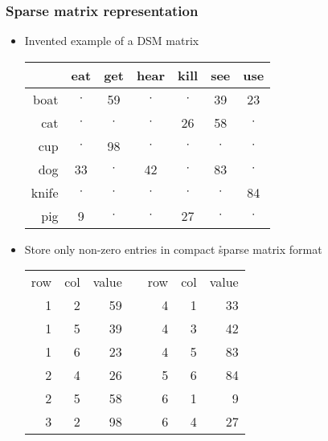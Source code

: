 \begin{frame}
  \frametitle{Sparse matrix representation}

  \ungap
  \begin{itemize}
  \item Invented example of a  DSM matrix
    \begin{center}\footnotesize
      \begin{tabular}{r | cccccc}
        & eat & get & hear & kill & see & use \\
        \midrule
        boat  &   $\cdot$  & 59  &   $\cdot$  &   $\cdot$  & 39 &  23 \\
        cat   &   $\cdot$  &  $\cdot$  &   $\cdot$  &  26  & 58 &   $\cdot$ \\
        cup   &   $\cdot$  & 98  &   $\cdot$  &   $\cdot$  &  $\cdot$ &   $\cdot$ \\
        dog   &  33  &  $\cdot$  &  42  &   $\cdot$  & 83 &   $\cdot$ \\
        knife &   $\cdot$  &  $\cdot$  &   $\cdot$  &   $\cdot$  &  $\cdot$ &  84 \\
        pig   &   9  &  $\cdot$  &   $\cdot$  &  27  &  $\cdot$ &   $\cdot$ 
      \end{tabular}
    \end{center}
    \gap\pause
  \item Store only non-zero entries in compact \h{sparse matrix format}
    \begin{center}\footnotesize
      \begin{tabular}{r|r|r c r|r|r}
        row & col & value && row & col & value \\
        \cline{1-3} \cline{5-7}
        1  &  2  &  59 &&  4  &  1  &  33 \\
        1  &  5  &  39 &&  4  &  3  &  42 \\
        1  &  6  &  23 &&  4  &  5  &  83 \\
        2  &  4  &  26 &&  5  &  6  &  84 \\
        2  &  5  &  58 &&  6  &  1  &   9 \\
        3  &  2  &  98 &&  6  &  4  &  27 \\
       \end{tabular}
    \end{center}
  \end{itemize}
\end{frame}

